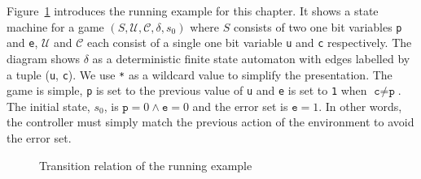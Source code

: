 \begin{example}

    Figure~\ref{fig:stratExample} introduces the running example for this chapter. It shows a state machine for a game $(S, \mathcal{U}, \mathcal{C}, \delta, s_0)$ where $S$ consists of two one bit variables \texttt{p} and \texttt{e}, $\mathcal{U}$ and $\mathcal{C}$ each consist of a single one bit variable \texttt{u} and \texttt{c} respectively. The diagram shows $\delta$ as a deterministic finite state automaton with edges labelled by a tuple (\texttt{u}, \texttt{c}). We use \texttt{*} as a wildcard value to simplify the presentation. The game is simple, \texttt{p} is set to the previous value of \texttt{u} and \texttt{e} is set to \texttt{1} when $\texttt{c} \neq \texttt{p}$. The initial state, $s_0$, is $\texttt{p} = 0 \land \texttt{e} = 0$ and the error set is $\texttt{e} = 1$. In other words, the controller must simply match the previous action of the environment to avoid the error set.

\end{example}


\begin{figure}
    \centering
    \caption{Transition relation of the running example}
    \label{fig:stratExample}
\end{figure}

